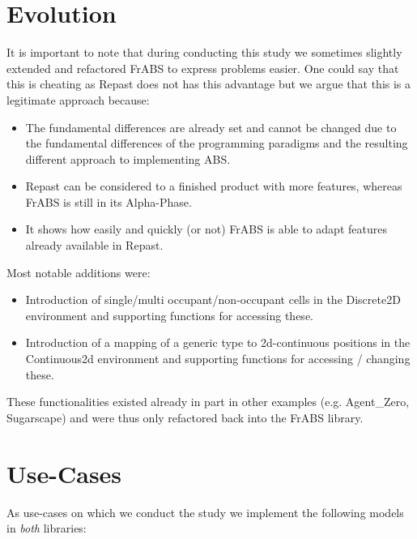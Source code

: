 \section{Evolution}
It is important to note that during conducting this study we sometimes slightly extended and refactored FrABS to express problems easier. One could say that this is cheating as Repast does not has this advantage but we argue that this is a legitimate approach because:

\begin{itemize}
	\item The fundamental differences are already set and cannot be changed due to the fundamental differences of the programming paradigms and the resulting different approach to implementing ABS.
	\item Repast can be considered to a finished product with more features, whereas FrABS is still in its Alpha-Phase.
	\item It shows how easily and quickly (or not) FrABS is able to adapt features already available in Repast.
\end{itemize}

Most notable additions were:
\begin{itemize}
	\item Introduction of single/multi occupant/non-occupant cells in the Discrete2D environment and supporting functions for accessing these.
	\item Introduction of a mapping of a generic type to 2d-continuous positions in the Continuous2d environment and supporting functions for accessing / changing these.
\end{itemize}

These functionalities existed already in part in other examples (e.g. Agent\_Zero, Sugarscape) and were thus only refactored back into the FrABS library.

\section{Use-Cases}
As use-cases on which we conduct the study we implement the following models in \textit{both} libraries:


